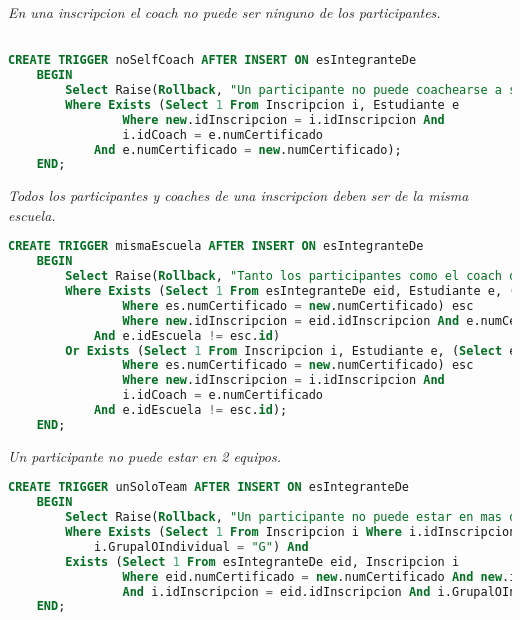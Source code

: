 \emph{En una inscripcion el coach no puede ser ninguno de los participantes.}

\begin{lstlisting}[language=SQL]

CREATE TRIGGER noSelfCoach AFTER INSERT ON esIntegranteDe
    BEGIN
        Select Raise(Rollback, "Un participante no puede coachearse a si mismo.")
        Where Exists (Select 1 From Inscripcion i, Estudiante e
                Where new.idInscripcion = i.idInscripcion And 
                i.idCoach = e.numCertificado
            And e.numCertificado = new.numCertificado);
    END;
\end{lstlisting}
  
\emph{Todos los participantes y coaches de una inscripcion deben ser de la misma escuela.}

\begin{lstlisting}[language=SQL]
CREATE TRIGGER mismaEscuela AFTER INSERT ON esIntegranteDe
    BEGIN
        Select Raise(Rollback, "Tanto los participantes como el coach deben ser de la misma escuela.")
        Where Exists (Select 1 From esIntegranteDe eid, Estudiante e, (Select es.idEscuela id From Estudiante es
                Where es.numCertificado = new.numCertificado) esc
                Where new.idInscripcion = eid.idInscripcion And e.numCertificado = eid.numCertificado
            And e.idEscuela != esc.id)
        Or Exists (Select 1 From Inscripcion i, Estudiante e, (Select es.idEscuela id From Estudiante es
                Where es.numCertificado = new.numCertificado) esc
                Where new.idInscripcion = i.idInscripcion And 
                i.idCoach = e.numCertificado
            And e.idEscuela != esc.id);
    END;
\end{lstlisting}

\emph{Un participante no puede estar en 2 equipos.}

\begin{lstlisting}[language=SQL]
CREATE TRIGGER unSoloTeam AFTER INSERT ON esIntegranteDe
    BEGIN
        Select Raise(Rollback, "Un participante no puede estar en mas de un equipo.")
        Where Exists (Select 1 From Inscripcion i Where i.idInscripcion = new.idInscripcion And 
            i.GrupalOIndividual = "G") And 
        Exists (Select 1 From esIntegranteDe eid, Inscripcion i 
                Where eid.numCertificado = new.numCertificado And new.idInscripcion != eid.idInscripcion
                And i.idInscripcion = eid.idInscripcion And i.GrupalOIndividual = "G");
    END;
\end{lstlisting}
  
